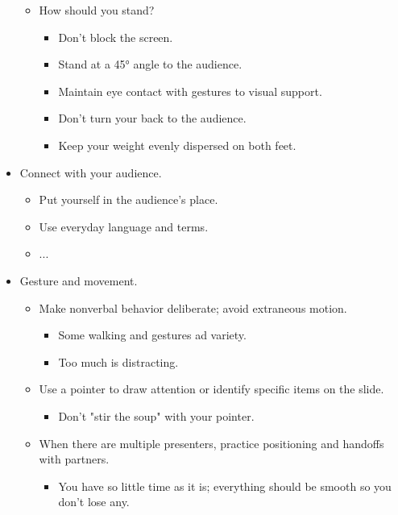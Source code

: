 \documentclass[../notes.tex]{subfiles}
\begin{document}
\begin{itemize}
\begin{itemize}
\begin{itemize}
        \end{itemize}
        \item How should you stand?
        \begin{itemize}
            \item Don't block the screen.
            \item Stand at a \ang{45} angle to the audience.
            \item Maintain eye contact with gestures to visual support.
            \item Don't turn your back to the audience.
            \item Keep your weight evenly dispersed on both feet.
        \end{itemize}
    \end{itemize}
    \item Connect with your audience.
    \begin{itemize}
        \item Put yourself in the audience's place.
        \item Use everyday language and terms.
        \item ...
    \end{itemize}
    \item Gesture and movement.
    \begin{itemize}
        \item Make nonverbal behavior deliberate; avoid extraneous motion.
        \begin{itemize}
            \item Some walking and gestures ad variety.
            \item Too much is distracting.
        \end{itemize}
        \item Use a pointer to draw attention or identify specific items on the slide.
        \begin{itemize}
            \item Don't "stir the soup" with your pointer.
        \end{itemize}
        \item When there are multiple presenters, practice positioning and handoffs with partners.
        \begin{itemize}
            \item You have so little time as it is; everything should be smooth so you don't lose any.
        \end{itemize}
    \end{itemize}

\end{itemize}
\end{document}
